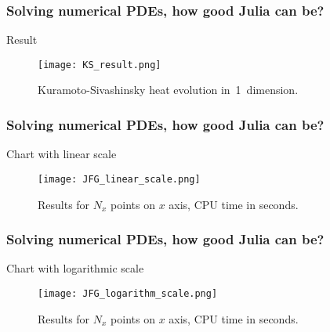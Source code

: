 \documentclass{beamer}  %
\begin{document}
\begin{frame}
  \frametitle{Solving numerical PDEs, how good Julia can be?}

  \begin{block}{Result}
    \begin{figure}
      \centering

      \texttt{[image: KS\_result.png]}
      \caption{Kuramoto-Sivashinsky heat evolution in~1~dimension.}
    \end{figure}
  \end{block}

\end{frame}





\begin{frame}
  \frametitle{Solving numerical PDEs, how good Julia can be?}

  \begin{block}{Chart with linear scale}
    \begin{figure}
      \centering

      \texttt{[image: JFG\_linear\_scale.png]}
      \caption{Results for $N_{ x }$ points on $x$ axis, CPU time in
        seconds.}
    \end{figure}
  \end{block}

\end{frame}





\begin{frame}
  \frametitle{Solving numerical PDEs, how good Julia can be?}

  \begin{block}{Chart with logarithmic scale}
    \begin{figure}
      \centering

      \texttt{[image: JFG\_logarithm\_scale.png]}
      \caption{Results for $N_{ x }$ points on $x$ axis, CPU time in
        seconds.}
    \end{figure}
  \end{block}

\end{frame}
\end{document}
